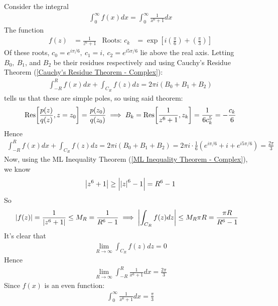\documentclass[12pt, english]{book}
\begin{document}
	\begin{example}
		Consider the integral 
		\begin{align*}
			\int_{0}^{\infty} f(x) dx 
			= \int_{0}^{\infty} \frac{1}{x^6 + 1} dx
		\end{align*}
		The function 
		\begin{align*}
			f(z) &= \frac{1}{z^6 + 1} 
				& \text{Roots: } c_k &= \exp[i\left(\frac{\pi}{6}\right) + \left(\frac{\pi}{3}\right)]
		\end{align*}
		Of these roots, \(c_0 = e^{i\pi/6}, \ c_1 = i, \ c_2 = e^{i5\pi/6}\) lie above the real axis. Letting \(B_0, \ B_1\), and \(B_2\) be their residues respectively and using Cauchy's Residue Theorem (\cref{Cauchy's Residue Theorem - Complex}):
		\begin{align*}
			\int_{-R}^{R} f(x) dx + \int_{C_R} f(z) dz = 2\pi i(B_0 + B_1 + B_2)
		\end{align*}
		 tells us that these are simple poles, so using said theorem:
		\begin{align*}
			\Res[\frac{p(z)}{q(z)}, z=z_0] = \frac{p(z_0)}{q(z_0)}
			\implies B_k = \Res[\frac{1}{z^6 + 1}, z_k] = \frac{1}{6 c_k^5} = -\frac{c_k}{6}
		\end{align*}
		Hence
		\begin{align*}
			\int_{-R}^{R} f(x) dx + \int_{C_R} f(z) dz 
			= 2\pi i(B_0 + B_1 + B_2)
			= 2\pi i \cdot \frac{1}{6} (e^{i\pi/6} + i + e^{i5\pi/6})
			= \frac{2\pi}{3}
		\end{align*}
		Now, using the ML Inequality Theorem (\cref{ML Inequality Theorem - Complex}), we know
		\begin{align*}
			\abs{z^6 + 1} \geq \abs{\abs{z}^6 - 1} = R^6 - 1
		\end{align*}
		So
		\begin{align*}
			\abs{f(z)} = \frac{1}{\abs{z^6 + 1}} \leq M_R = \frac{1}{R^6 - 1} 
			&\implies \abs{\int_{C_R} f(z) dz} \leq M_R \pi R = \frac{\pi R}{R^6 - 1}
		\end{align*}
		It's clear that 
		\begin{align*}
			\lim_{R \rightarrow \infty} \int_{C_R} f(z) dz = 0
		\end{align*}
		Hence
		\begin{align*}
			\lim_{R \rightarrow \infty} \int_{-R}^{R} \frac{1}{x^6 + 1} dx = \frac{2\pi}{3}
		\end{align*}
		Since \(f(x)\) is an even function:
		\begin{align*}
			\int_{0}^{\infty} \frac{1}{x^6 + 1} dx = \frac{\pi}{3}
		\end{align*}
	\end{example}
\end{document}
